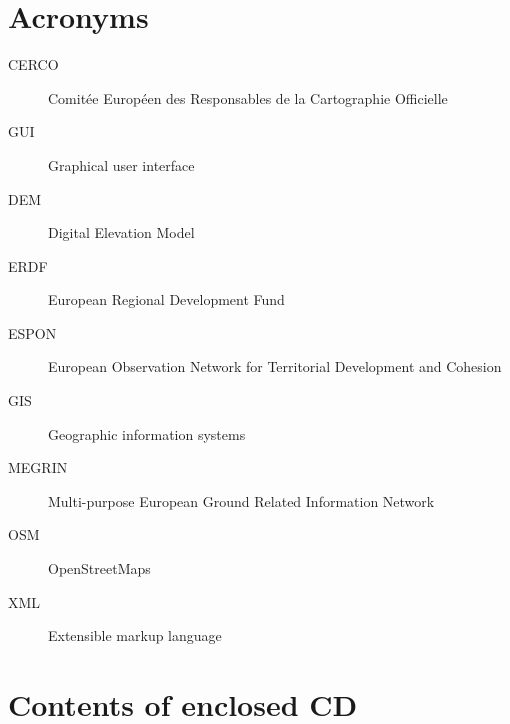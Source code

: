 \documentclass[thesis=M,english]{FITthesis}[2012/10/20]
\begin{document}
\chapter{Acronyms}
\begin{description}
	\item[CERCO] Comit{\' e}e Europ{\' e}en des Responsables de la Cartographie Officielle\item[GUI] Graphical user interface
	\item[DEM] Digital Elevation Model
	\item[ERDF] European Regional Development Fund
	\item[ESPON] European Observation Network for Territorial Development and Cohesion
	\item[GIS] Geographic information systems	
	\item[MEGRIN] Multi-purpose European Ground Related Information Network
	\item[OSM] OpenStreetMaps
	\item[XML] Extensible markup language
	
	
\end{description}


\chapter{Contents of enclosed CD}


\begin{figure}
\end{figure}
\end{document}
